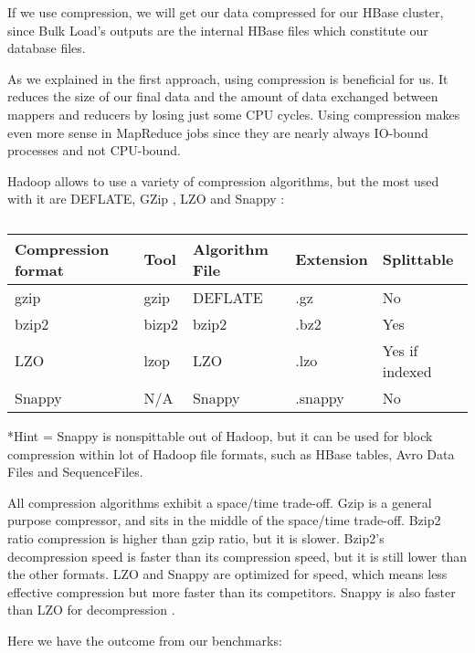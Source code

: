 If we use compression, we will get our data compressed for our HBase cluster, since Bulk Load's outputs are the internal HBase files which constitute our database files.
\par
As we explained in the first approach, using compression is beneficial for us. It reduces the size of our final data and the amount of data  exchanged between mappers and reducers by losing just some CPU cycles. Using compression makes even more sense in MapReduce jobs since they are nearly always IO-bound processes and not CPU-bound.
\par
Hadoop allows to use a variety of compression algorithms, but the most used with it are DEFLATE, GZip \cite{GZip}, LZO and Snappy \cite{Snappy}:

\begin{table}[htbp]
\caption{}
\begin{tabular}{|l|l|l|l|l|}
\hline
Compression format  & Tool  & Algorithm File  & Extension  & Splittable \\ \hline
gzip &  gzip  & DEFLATE  & .gz &  No \\ \hline
bzip2  & bizp2  & bzip2  & .bz2  & Yes \\ \hline
LZO &  lzop &  LZO  & .lzo &  Yes if indexed \\ \hline
Snappy  & N/A  & Snappy  & .snappy  & No \\ \hline
\end{tabular}
\label{}
\end{table}


*Hint = Snappy is nonspittable out of Hadoop, but it can be used for block compression within lot of Hadoop file formats, such as HBase tables, Avro Data Files and SequenceFiles.
\par
All compression algorithms exhibit a space/time trade-off. Gzip is a general purpose compressor, and sits in the middle of the space/time trade-off. Bzip2 ratio compression is higher than gzip ratio, but it is slower. Bzip2's decompression speed is faster than its compression speed, but it is still lower than the other formats. LZO and Snappy are optimized for speed, which means less effective compression but more faster than its competitors. Snappy is also faster than LZO for decompression \cite{CompressionHadoop}.
\par
Here we have the outcome from our benchmarks:
\par



